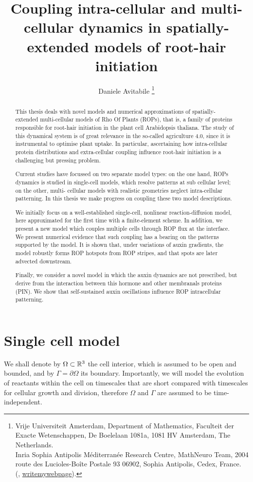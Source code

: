 \documentclass[a4paper]{siamonline220329}
\title{Coupling intra-cellular and multi-cellular dynamics in spatially-extended models of root-hair initiation}
\author{%
  Daniele Avitabile%
  \thanks{%
    Vrije Universiteit Amsterdam,
    Department of Mathematics,
    Faculteit der Exacte Wetenschappen,
    De Boelelaan 1081a,
    1081 HV Amsterdam, The Netherlands.
  \protect\\
    Inria Sophia Antipolis M\'editerran\'ee Research Centre,
    MathNeuro Team,
    2004 route des Lucioles-Boîte Postale 93 06902,
    Sophia Antipolis, Cedex, France.
  \protect\\
    (\email{d.avitabile@vu.nl}, \url{writemywebpage}).
  }
}
\begin{document}
\maketitle

\begin{abstract}
This thesis deals with novel models and numerical approximations of
spatially-extended multi-cellular models of Rho Of Plants (ROPs), that is, a family
of proteins responsible for root-hair initiation in the plant cell Arabidopsis
thaliana. The study of this dynamical system is of great relevance in the so-called
agriculture 4.0, since it is instrumental to optimise plant uptake. In particular,
ascertaining how intra-cellular protein distributions and extra-cellular coupling
influence root-hair initiation is a challenging but pressing problem.

Current studies have focussed on two separate model types: on the one hand, ROPs dynamics is studied in single-cell models, which resolve patterns at sub cellular level; on the other, multi- cellular models with realistic geometries neglect intra-cellular patterning. In this thesis we make progress on coupling these two
model descriptions.

We initially focus on a well-established single-cell, nonlinear reaction-diffusion model, here approximated for the first time with a finite-element scheme. In addition, we present a new model which couples multiple cells through ROP flux at the interface. We present numerical evidence that such coupling has a bearing on the patterns supported by the model. It is shown that, under variations of auxin gradients, the model robustly forms ROP hotspots from ROP stripes, and that spots are later advected downstream.

Finally, we consider a novel model in which the auxin dynamics are not prescribed, but derive from the interaction between this hormone and other membranals proteins (PIN). We show that self-sustained auxin oscillations influence ROP intracellular patterning.
\end{abstract}

\section{Single cell model}\label{sec:singleCell} 

We shall denote by $\Omega \subset \mathbb{R}^3$ the cell interior, which is assumed to be
open and bounded, and by $\Gamma = \partial \Omega$ its boundary.  Importantly, we will model the evolution of
reactants within the cell on timescales that are short compared with timescales for
cellular growth and division, therefore $\Omega$ and $\Gamma$ are assumed to be
time-independent.
\end{document}
